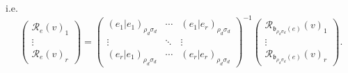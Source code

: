 \documentclass[aps,preprint]{revtex4}
\begin{document}
\begin{enumerate}
i.e. 
\begin{equation}
\left( 
\begin{array}{c}
\mathcal{R}_{e}\left( v\right) _{1} \\ 
\vdots \\ 
\mathcal{R}_{e}\left( v\right) _{r}%
\end{array}%
\right) =\left( 
\begin{array}{ccc}
\left( \left. e_{1}\right\vert e_{1}\right) _{\rho _{d}\sigma _{d}} & \cdots
& \left( \left. e_{1}\right\vert e_{r}\right) _{\rho _{d}\sigma _{d}} \\ 
\vdots & \ddots & \vdots \\ 
\left( \left. e_{r}\right\vert e_{1}\right) _{\rho _{d}\sigma _{d}} & \cdots
& \left( \left. e_{r}\right\vert e_{r}\right) _{\rho _{d}\sigma _{d}}%
\end{array}%
\right) ^{\boldsymbol{-}1}\left( 
\begin{array}{c}
\mathcal{R}_{\mathfrak{b}_{\rho _{d}\sigma _{d}}\left( e\right) }\left(
v\right) _{1} \\ 
\vdots \\ 
\mathcal{R}_{\mathfrak{b}_{\rho _{d}\sigma _{d}}\left( e\right) }\left(
v\right) _{r}%
\end{array}%
\right) .
\end{equation}


\end{enumerate}
\end{document}
